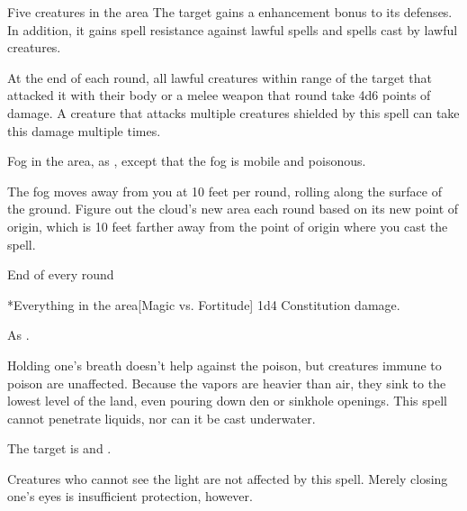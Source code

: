\spelldur{\durshort \dismissable}
\begin{spelltargets}{Five creatures in the area}
    The target gains a  enhancement bonus to its defenses. In addition, it gains spell resistance against lawful spells and spells cast by lawful creatures.
    \par At the end of each round, all lawful creatures within \rngclose range of the target that attacked it with their body or a melee weapon that round take 4d6 points of damage. A creature that attacks multiple creatures shielded by this spell can take this damage multiple times.
\end{spelltargets}

\spelldur{\durshort}
\spellline
\spelleffect Fog in the area, as , except that the fog is mobile and poisonous.

\par The fog moves away from you at 10 feet per round, rolling along the surface of the ground. Figure out the cloud's new area each round based on its new point of origin, which is 10 feet farther away from the point of origin where you cast the spell.
\begin{spelltrigger}{End of every round}
    \begin{spelltargets}*{Everything in the area}[Magic vs. Fortitude]
        \spellsuccess 1d4 Constitution damage.
    \end{spelltargets}
\end{spelltrigger}
\spellnotes As .

Holding one's breath doesn't help against the poison, but creatures immune to poison are unaffected. Because the vapors are heavier than air, they sink to the lowest level of the land, even pouring down den or sinkhole openings. This spell cannot penetrate liquids, nor can it be cast underwater.

\begin{spelltargets}
    \spellsuccess The target is \dazzled and \bewildered.
\end{spelltargets}
\spellnotes Creatures who cannot see the light are not affected by this spell. Merely closing one's eyes is insufficient protection, however.

